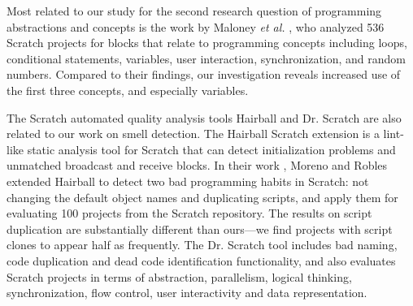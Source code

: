 \documentclass{sig-alternate}
\begin{document}
Most related to our study for the second research question of programming abstractions and concepts is the work by Maloney \emph{et al.} \cite{Maloney_2008}, who analyzed 536 Scratch projects for blocks that relate to programming concepts including loops, conditional statements, variables, user interaction, synchronization, and random numbers. Compared to their findings, our investigation reveals increased use of the first three concepts, and especially variables.

The Scratch automated quality analysis tools Hairball \cite{boe_hairball:_2013} and Dr. Scratch \cite{moreno-leon_dr._2015} are also related to our work on smell detection. The Hairball Scratch extension is a lint-like static analysis tool for Scratch that can detect initialization problems and unmatched broadcast and receive blocks. In their work \cite{moreno_automatic_2014}, Moreno and Robles extended Hairball to detect two bad programming habits in Scratch: not changing the default object names and duplicating scripts, and apply them for evaluating 100 projects from the Scratch repository. The results on script duplication are substantially different than ours---we find projects with script clones to appear half as frequently. The Dr. Scratch tool \cite{moreno-leon_dr._2015} includes bad naming, code duplication and dead code identification functionality, and also evaluates Scratch projects in terms of abstraction, parallelism, logical thinking, synchronization, flow control, user interactivity and data representation.

\end{document}
